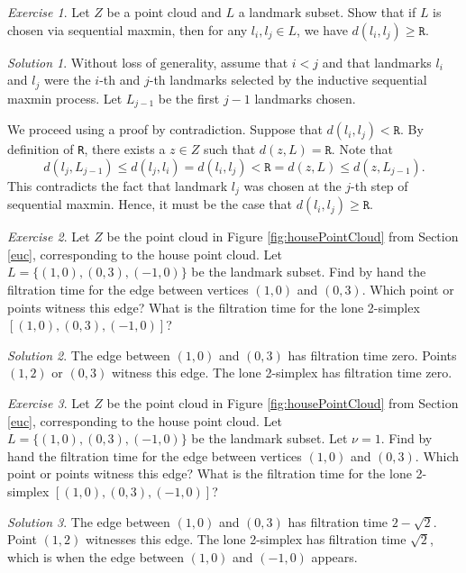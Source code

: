 \documentclass[amscd, amssymb, verbatim]{amsart}[12pt]
\theoremstyle{remark}
\theoremstyle{remark}
\newtheorem{exerciseSol}{Exercise}
\theoremstyle{remark}
\newtheorem*{solution}{Solution}
\begin{document}
\begin{exerciseSol}
Let $Z$ be a point cloud and $L$ a landmark subset. Show that if $L$ is chosen via sequential maxmin, then for any $l_i,l_j\in L$, we have $d(l_i,l_j)\geq\texttt{R}$.
\end{exerciseSol}

\begin{solution}
Without loss of generality, assume that $i < j$ and that landmarks $l_i$ and $l_j$ were the $i$-th and $j$-th landmarks selected by the inductive sequential maxmin process. Let $L_{j-1}$ be the first $j - 1$ landmarks chosen. 

We proceed using a proof by contradiction. Suppose that $d(l_i, l_j) < \texttt{R}$. By definition of \texttt{R}, there exists a $z \in Z$ such that $d(z,L) = \texttt{R}$. Note that
$$d(l_j, L_{j-1}) \leq d(l_j, l_i) = d(l_i, l_j) < \texttt{R} = d(z,L) \leq d(z, L_{j-1}).$$
This contradicts the fact that landmark $l_j$ was chosen at the $j$-th step of sequential maxmin. Hence, it must be the case that $d(l_i, l_j) \geq \texttt{R}$. 
\end{solution}

\begin{exerciseSol}
Let $Z$ be the point cloud in Figure \ref{fig:housePointCloud} from Section \ref{euc}, corresponding to the house point cloud. Let $L = \{(1,0),(0,3),(-1,0)\}$ be the landmark subset. Find by hand the filtration time for the edge between vertices $(1,0)$ and $(0,3)$. Which point or points witness this edge? What is the filtration time for the lone 2-simplex $[(1,0),(0,3),(-1,0)]$?
\end{exerciseSol}

\begin{solution}
The edge between $(1, 0)$ and $(0, 3)$ has filtration time zero. Points $(1, 2)$ or $(0, 3)$ witness this edge. The lone 2-simplex has filtration time zero. 
\end{solution}

\begin{exerciseSol}
Let $Z$ be the point cloud in Figure \ref{fig:housePointCloud} from Section \ref{euc}, corresponding to the house point cloud. Let $L = \{(1,0),(0,3),(-1,0)\}$ be the landmark subset. Let $\nu = 1$. Find by hand the filtration time for the edge between vertices $(1,0)$ and $(0,3)$. Which point or points witness this edge? What is the filtration time for the lone 2-simplex $[(1,0),(0,3),(-1,0)]$?
\end{exerciseSol}

\begin{solution}
The edge between $(1, 0)$ and $(0, 3)$ has filtration time $2-\sqrt{2}$. Point $(1, 2)$ witnesses this edge. The lone 2-simplex has filtration time $\sqrt{2}$, which is when the edge between $(1, 0)$ and $(-1, 0)$ appears. 
\end{solution}
\end{document}
